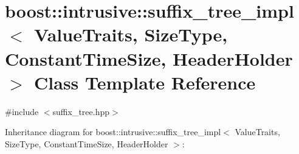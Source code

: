 \hypertarget{classboost_1_1intrusive_1_1suffix__tree__impl}{}\section{boost\+:\+:intrusive\+:\+:suffix\+\_\+tree\+\_\+impl$<$ Value\+Traits, Size\+Type, Constant\+Time\+Size, Header\+Holder $>$ Class Template Reference}
\label{classboost_1_1intrusive_1_1suffix__tree__impl}


{\ttfamily \#include $<$suffix\+\_\+tree.\+hpp$>$}



Inheritance diagram for boost\+:\+:intrusive\+:\+:suffix\+\_\+tree\+\_\+impl$<$ Value\+Traits, Size\+Type, Constant\+Time\+Size, Header\+Holder $>$\+:
